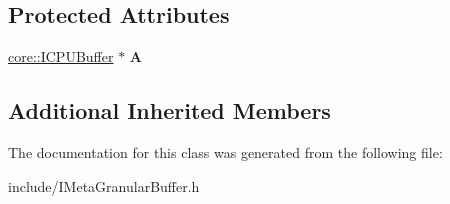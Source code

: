 \subsection*{Protected Attributes}
\begin{DoxyCompactItemize}
\item 
\hyperlink{classirr_1_1core_1_1ICPUBuffer}{core\+::\+I\+C\+P\+U\+Buffer} $\ast$ {\bfseries A}\hypertarget{classirr_1_1core_1_1IMetaGranularCPUBuffer_a24be9466e652e9819f0d677876e336cf}{}\label{classirr_1_1core_1_1IMetaGranularCPUBuffer_a24be9466e652e9819f0d677876e336cf}

\end{DoxyCompactItemize}
\subsection*{Additional Inherited Members}


The documentation for this class was generated from the following file\+:\begin{DoxyCompactItemize}
\item 
include/I\+Meta\+Granular\+Buffer.\+h\end{DoxyCompactItemize}
